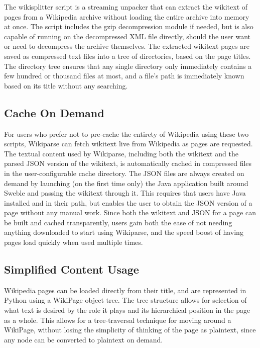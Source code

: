 The wikisplitter script is a streaming unpacker that can extract the wikitext of pages from a Wikipedia archive without loading the entire archive into memory at once. The script includes the gzip decompression module if needed, but is also capable of running on the decompressed XML file directly, should the user want or need to decompress the archive themselves. The extracted wikitext pages are saved as compressed text files into a tree of directories, based on the page titles. The directory tree ensures that any single directory only immediately contains a few hundred or thousand files at most, and a file's path is immediately known based on its title without any searching.


\subsection{Cache On Demand}

For users who prefer not to pre-cache the entirety of Wikipedia using these two scripts, Wikiparse can fetch wikitext live from Wikipedia as pages are requested. The textual content used by Wikiparse, including both the wikitext and the parsed JSON version of the wikitext, is automatically cached in compressed files in the user-configurable cache directory. The JSON files are always created on demand by launching (on the first time only) the Java application built around Sweble and passing the wikitext through it. This requires that users have Java installed and in their path, but enables the user to obtain the JSON version of a page without any manual work. Since both the wikitext and JSON for a page can be built and cached transparently, users gain both the ease of not needing anything downloaded to start using Wikiparse, and the speed boost of having pages load quickly when used multiple times.


\subsection{Simplified Content Usage}

Wikipedia pages can be loaded directly from their title, and are represented in Python using a WikiPage object tree. The tree structure allows for selection of what text is desired by the role it plays and its hierarchical position in the page as a whole. This allows for a tree-traversal technique for moving around a WikiPage, without losing the simplicity of thinking of the page as plaintext, since any node can be converted to plaintext on demand.


